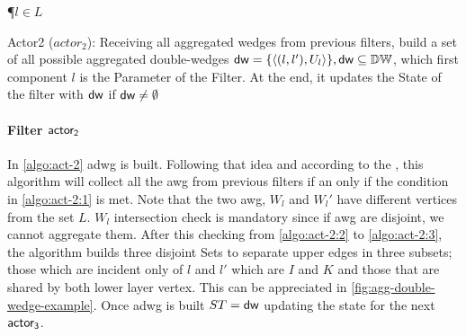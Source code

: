 \begin{algorithm}[h!]
\SetAlgoRefName{[A6]}
\P{$l \in L$}
\BlankLine
{}
\PC{$|\dwi| \geq 1 \lor \fid$}
\caption[Actor2 ($actor_2$)]{Actor2 ($actor_2$): Receiving all aggregated wedges from previous filters, build a set of all possible aggregated double-wedges $\mathsf{dw} = \{\left\langle (l,l'), U_l \right\rangle\}, \mathsf{dw} \subseteq \mathbb{DW}$, which first component $l$ is the Parameter of the Filter. At the end, it updates the State of the filter with $\mathsf{dw}$ if $\mathsf{dw} \neq \emptyset$}
\label{algo:act-2}
\end{algorithm}

\paragraph{Filter $\mathsf{actor_2}$} In \autoref{algo:act-2} \acrshort{adwg} is built. Following that idea and according to the , this algorithm will collect all the \acrshort{awg} 
from previous filters if an only if the condition in \autoref{algo:act-2:1} is met. Note that the two \acrshort{awg}, $W_l$ and $W_l'$ have different vertices from the set $L$. $W_l$ intersection check is mandatory since if \acrshort{awg} are disjoint, we cannot aggregate them.
After this checking from \autoref{algo:act-2:2} to \autoref{algo:act-2:3}, the algorithm builds three disjoint Sets to separate upper edges in three subsets; those which are incident only of 
$l$ and $l'$ which are $I$ and $K$ and those that are shared by both lower layer vertex. This can be appreciated in \autoref{fig:agg-double-wedge-example}.
Once \acrshort{adwg} is built $ST = \mathsf{dw}$ updating the state for the next $\mathsf{actor_3}$.


